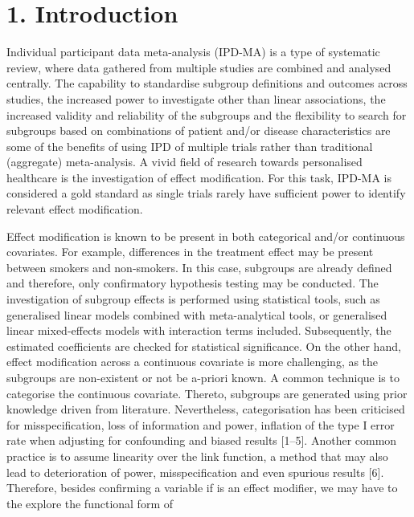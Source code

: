 \documentclass[14pt,]{article}
\begin{document}
\section{1. Introduction}\label{introduction}

\par      

Individual participant data meta-analysis (IPD-MA) is a type of
systematic review, where data gathered from multiple studies are
combined and analysed centrally. The capability to standardise subgroup
definitions and outcomes across studies, the increased power to
investigate other than linear associations, the increased validity and
reliability of the subgroups and the flexibility to search for subgroups
based on combinations of patient and/or disease characteristics are some
of the benefits of using IPD of multiple trials rather than traditional
(aggregate) meta-analysis. A vivid field of research towards
personalised healthcare is the investigation of effect modification. For
this task, IPD-MA is considered a gold standard as single trials rarely
have sufficient power to identify relevant effect modification.
\par      Effect modification is known to be present in both categorical
and/or continuous covariates. For example, differences in the treatment
effect may be present between smokers and non-smokers. In this case,
subgroups are already defined and therefore, only confirmatory
hypothesis testing may be conducted. The investigation of subgroup
effects is performed using statistical tools, such as generalised linear
models combined with meta-analytical tools, or generalised linear
mixed-effects models with interaction terms included. Subsequently, the
estimated coefficients are checked for statistical significance. On the
other hand, effect modification across a continuous covariate is more
challenging, as the subgroups are non-existent or not be a-priori known.
A common technique is to categorise the continuous covariate. Thereto,
subgroups are generated using prior knowledge driven from literature.
Nevertheless, categorisation has been criticised for misspecification,
loss of information and power, inflation of the type I error rate when
adjusting for confounding and biased results {[}1--5{]}. Another common
practice is to assume linearity over the link function, a method that
may also lead to deterioration of power, misspecification and even
spurious results {[}6{]}. Therefore, besides confirming a variable if is
an effect modifier, we may have to the explore the functional form of
\end{document}
